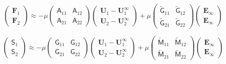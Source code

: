 \documentclass[12pt]{article}
\newcommand{\tens}[1]{\bm{\mathsf{#1}}}
\begin{document}
\begin{equation}
 \begin{pmatrix}
  \bm{F}_{1} \\
  \bm{F}_{2} 
 \end{pmatrix}
\approx
- \mu
\begin{pmatrix}
\tens{A}_{11} &
\tens{A}_{12}  \\
\tens{A}_{21}  &
\tens{A}_{22}  
\end{pmatrix}
 \begin{pmatrix}
  \bm{U}_{1} -  \bm{U}_{1}^{\infty}\\
  \bm{U}_{2} -  \bm{U}_{2}^{\infty}
 \end{pmatrix}
 + \mu
\begin{pmatrix}
\tilde{\tens{G}}_{11} &
\tilde{\tens{G}}_{12}  \\
\tilde{\tens{G}}_{21}  &
\tilde{\tens{G}}_{22}  
\end{pmatrix}
 \begin{pmatrix}
\bm{E}_{\infty} \\ \bm{E}_{\infty}
\end{pmatrix}
\end{equation}

\begin{equation}
 \begin{pmatrix}
  \tens{S}_{1} \\
  \tens{S}_{2} 
 \end{pmatrix}
\approx
- \mu
\begin{pmatrix}
\tens{G}_{11} &
\tens{G}_{12}  \\
\tens{G}_{21}  &
\tens{G}_{22}  
\end{pmatrix}
 \begin{pmatrix}
  \bm{U}_{1} -  \bm{U}_{1}^{\infty}\\
  \bm{U}_{2} -  \bm{U}_{2}^{\infty}
 \end{pmatrix}
 + \mu
\begin{pmatrix}
\tilde{\tens{M}}_{11} &
\tilde{\tens{M}}_{12}  \\
\tilde{\tens{M}}_{21}  &
\tilde{\tens{M}}_{22}  
\end{pmatrix}
 \begin{pmatrix}
\bm{E}_{\infty} \\ \bm{E}_{\infty}
\end{pmatrix}
\end{equation}



\end{document}
